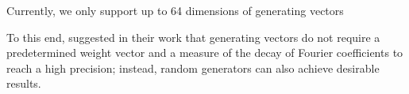 Currently, we only support up to 64 dimensions of generating vectors




To this end, suggested in their work \cite{doi:10.1137/22M1473625} that generating vectors do not require a predetermined weight vector and a  measure of the decay of Fourier coefficients to reach a high precision; instead, random generators can also achieve desirable results.


